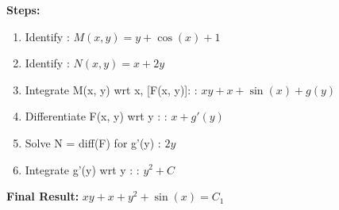 \documentclass{article}
\begin{document}
\textbf{Steps:}
\begin{enumerate}
\item Identify :  $M(x, y) = y + \cos{\left(x \right)} + 1$
\item Identify :  $N(x, y) = x + 2 y$
\item Integrate M(x, y) wrt x, [F(x, y)]: :  $x y + x + \sin{\left(x \right)} + g(y)$
\item Differentiate F(x, y) wrt y :  :  $x + g'(y)$
\item Solve N = diff(F) for g'(y) :  $2 y$
\item Integrate g'(y) wrt y :  :  $y^{2} + C$
\end{enumerate}
\textbf{Final Result:} $x y + x + y^{2} + \sin{\left(x \right)} = C_{1}$
\end{document}
